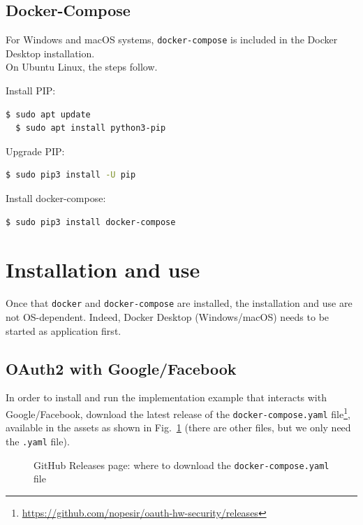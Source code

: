 \subsection{Docker-Compose}
For Windows and macOS systems, \texttt{docker-compose} is included in the Docker Desktop installation.\\
On Ubuntu Linux, the steps follow.

\noindent Install PIP:
\begin{lstlisting}[language=bash]
  $ sudo apt update
  $ sudo apt install python3-pip
\end{lstlisting}

\noindent Upgrade PIP:
\begin{lstlisting}[language=bash]
  $ sudo pip3 install -U pip
\end{lstlisting}

\noindent Install docker-compose:
\begin{lstlisting}[language=bash]
  $ sudo pip3 install docker-compose
\end{lstlisting}

\section{Installation and use}
Once that \texttt{docker} and \texttt{docker-compose} are installed, the installation and use are not OS-dependent. Indeed, Docker Desktop (Windows/macOS) needs to be started as application first.

\subsection{OAuth2 with Google/Facebook}
In order to install and run the implementation example that interacts with Google/Facebook, download the latest release of the \texttt{docker-compose.yaml} file\footnote{\url{https://github.com/nopesir/oauth-hw-security/releases}}, available in the assets as shown in Fig.~\ref{fig:rel1} (there are other files, but we only need the \texttt{.yaml} file).

\begin{figure}[h!]
    \centering
    \caption{GitHub Releases page: where to download the \texttt{docker-compose.yaml} file}
    \label{fig:rel1}
\end{figure}

